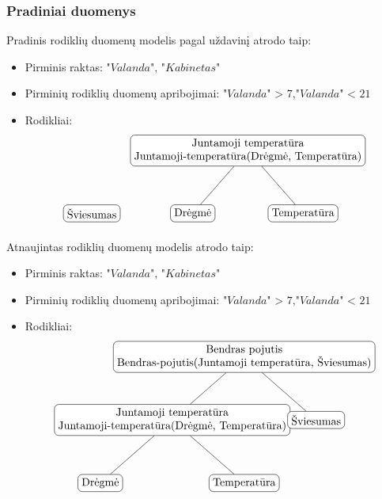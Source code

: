 \documentclass{VUMIFPSbakalaurinis}
\begin{document}
\subsubsection{Pradiniai duomenys}
\noindent Pradinis rodiklių duomenų modelis pagal uždavinį atrodo taip:
\begin{itemize}
    \item Pirminis raktas: \(\textit{"Valanda", "Kabinetas"}\)
    \item Pirminių rodiklių duomenų apribojimai: \(\textit{"Valanda" > 7},\textit{"Valanda" < 21}\) 
    \item Rodikliai:
    \[
        \begin{tikzpicture}[sibling distance=10em,
            level distance=2cm,
            every node/.style = {shape=rectangle, rounded corners,	
                                draw, align=center,	
                                top color=white, bottom color=white}]	
            \node{Šviesumas}; 	
        \end{tikzpicture}\>\>\>\>
        \begin{tikzpicture}[sibling distance=10em,
            level distance=2cm,
            every node/.style = {shape=rectangle, rounded corners,	
                                draw, align=center,	
                                top color=white, bottom color=white}]	
            \node{Juntamoji temperatūra\\Juntamoji-temperatūra(Drėgmė, Temperatūra)}
                    child { node {Drėgmė} }	
                    child { node {Temperatūra} } ; 	
        \end{tikzpicture} 	
    \]
\end{itemize}
Atnaujintas rodiklių duomenų modelis atrodo taip:
\begin{itemize}
    \item Pirminis raktas: \(\textit{"Valanda", "Kabinetas"}\)
    \item Pirminių rodiklių duomenų apribojimai: \(\textit{"Valanda" > 7},\textit{"Valanda" < 21}\) 
    \item Rodikliai:
    \[	
        \begin{tikzpicture}[sibling distance=13em,
            level distance=2cm,
            every node/.style = {shape=rectangle, rounded corners,	
                                draw, align=center,	
                                top color=white, bottom color=white}]	
            \node{ Bendras pojutis \\Bendras-pojutis(Juntamoji temperatūra, Šviesumas)}
                child{ node {Juntamoji temperatūra\\Juntamoji-temperatūra(Drėgmė, Temperatūra)}
                        child { node {Drėgmė} }	
                        child { node {Temperatūra} } }
                child {node {Šviesumas}}; 	
        \end{tikzpicture} 	
    \]
\end{itemize}
\end{document}
